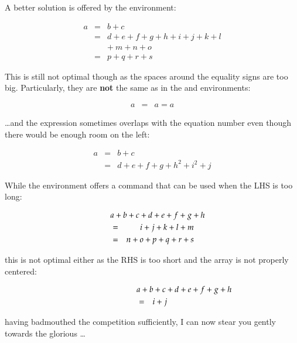 A better solution is offered by the  environment:
\begin{example}
\begin{eqnarray}
  a & = & b + c \\
  & = & d + e + f + g + h + i 
  + j + k + l \nonumber \\
  && +\: m + n + o \\
  & = & p + q + r + s
\end{eqnarray}
\end{example}

This is still not optimal though as
the spaces around the equality signs are too big.
Particularly, they are \textbf{not} the same as in the
 and  environments:
\begin{example}
\begin{eqnarray}
  a & = & a = a
\end{eqnarray}
\end{example}

\noindent \ldots and the expression sometimes overlaps with the equation number even
  though there would be enough room on the left:
\begin{example}
\begin{eqnarray}
  a & = & b + c 
  \\
  & = & d + e + f + g + h^2 
  + i^2 + j 
  \label{eq:faultyeqnarray}
\end{eqnarray}
\end{example}

\noindent While the environment offers a command  that can
  be used when the LHS is too long:
\begin{example}
\begin{eqnarray}
  \lefteqn{a + b + c + d 
    + e + f + g + h}\nonumber\\
  & = & i + j + k + l + m 
  \\
  & = & n + o + p + q + r + s
\end{eqnarray}
\end{example}
\noindent this is not optimal either as the RHS is too short and the array is
not properly centered:
\begin{example}
\begin{eqnarray}
  \lefteqn{a + b + c + d 
    + e + f + g + h} 
  \nonumber \\
  & = & i + j 
\end{eqnarray}
\end{example}

\noindent having badmouthed the competition sufficiently, I can now stear you gently towards the glorious \ldots

